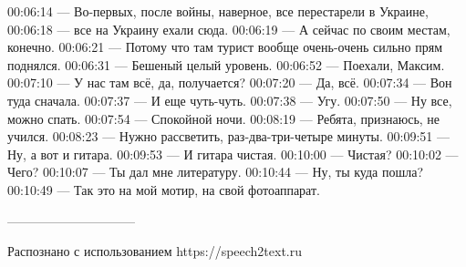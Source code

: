 00:06:14 — Во-первых, после войны, наверное, все перестарели в Украине,
00:06:18 — все на Украину ехали сюда.
00:06:19 — А сейчас по своим местам, конечно.
00:06:21 — Потому что там турист вообще очень-очень сильно прям поднялся.
00:06:31 — Бешеный целый уровень.
00:06:52 — Поехали, Максим.
00:07:10 — У нас там всё, да, получается?
00:07:20 — Да, всё.
00:07:34 — Вон туда сначала.
00:07:37 — И еще чуть-чуть.
00:07:38 — Угу.
00:07:50 — Ну все, можно спать.
00:07:54 — Спокойной ночи.
00:08:19 — Ребята, признаюсь, не учился.
00:08:23 — Нужно рассветить, раз-два-три-четыре минуты.
00:09:51 — Ну, а вот и гитара.
00:09:53 — И гитара чистая.
00:10:00 — Чистая?
00:10:02 — Чего?
00:10:07 — Ты дал мне литературу.
00:10:44 — Ну, ты куда пошла?
00:10:49 — Так это на мой мотир, на свой фотоаппарат.



——————————

Распознано с использованием https://speech2text.ru
